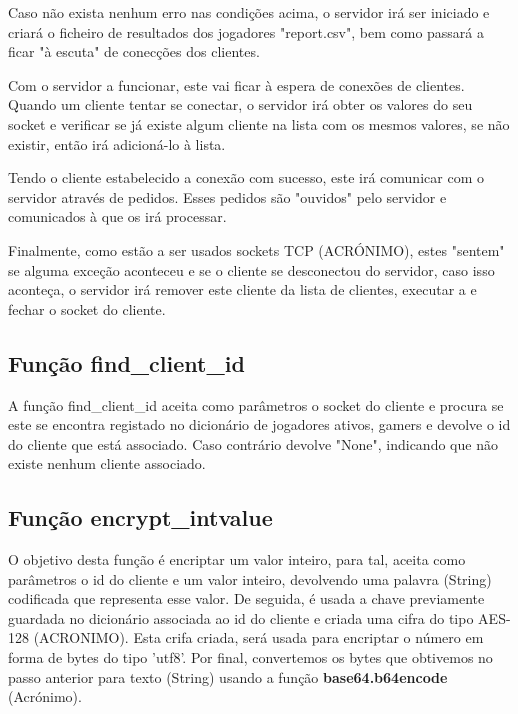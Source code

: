 \documentclass{report}
\begin{document}
Caso não exista nenhum erro nas condições acima, o servidor irá ser iniciado e criará o ficheiro de resultados dos jogadores "report.csv", bem como passará a ficar "à escuta" de conecções dos clientes.

Com o servidor a funcionar, este vai ficar à espera de conexões de clientes. Quando um cliente tentar se conectar, o servidor irá obter os valores do seu socket e verificar se já existe algum cliente na lista com os mesmos valores, se não existir, então irá adicioná-lo à lista.

Tendo o cliente estabelecido a conexão com sucesso, este irá comunicar com o servidor através de pedidos. Esses pedidos são "ouvidos" pelo servidor e comunicados à  que os irá processar.

Finalmente, como estão a ser usados sockets TCP (ACRÓNIMO), estes "sentem" se alguma exceção aconteceu e se o cliente se desconectou do servidor, caso isso aconteça, o servidor irá remover este cliente da lista de clientes, executar a  e fechar o socket do cliente.

\subsection{Função find\_client\_id}
\label{ssec:func_find_client_id}

A função find\_client\_id aceita como parâmetros o socket do cliente e procura se este se encontra registado no dicionário de jogadores ativos, gamers e devolve o id do cliente que está associado. Caso contrário devolve "None", indicando que não existe nenhum cliente associado.

\subsection{Função encrypt\_intvalue}
\label{ssec:func_encrypt_value_server}

O objetivo desta função é encriptar um valor inteiro, para tal, aceita como parâmetros o id do cliente e um valor inteiro, devolvendo uma palavra (String) codificada que representa esse valor. De seguida, é usada a chave previamente guardada no dicionário associada ao id do cliente e criada uma cifra do tipo AES-128 (ACRONIMO). Esta crifa criada, será usada para encriptar o número em forma de bytes do tipo 'utf8'. Por final, convertemos os bytes que obtivemos no passo anterior para texto (String) usando a função \textbf{base64.b64encode} (Acrónimo).
\end{document}
